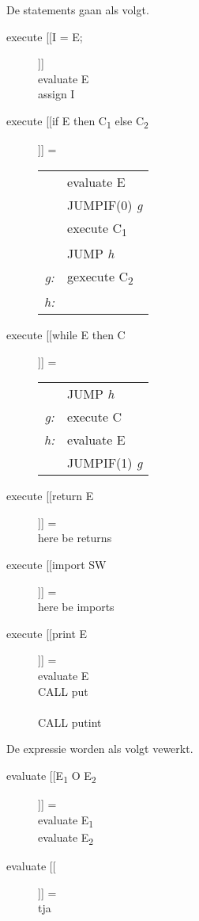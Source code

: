 De statements gaan als volgt.
\begin{description}
    \item[execute [[I = E;]]] \hfill \\
        evaluate E \\
        assign I
    \item[execute [[if E then C\textsubscript{1} else C\textsubscript{2}]]] = \hfill \\
        \begin{tabular}{c l}
            &evaluate E \\
            &JUMPIF(0) \emph{g} \\
            &execute C\textsubscript{1} \\
            &JUMP \emph{h} \\
    \emph{g:}&gexecute C\textsubscript{2} \\
    \emph{h:}& \\
        \end{tabular}
    \item[execute [[while E then C]]] = \hfill \\
        \begin{tabular}{c l}
            &JUMP \emph{h} \\
    \emph{g:}&execute C \\
    \emph{h:}&evaluate E \\
            &JUMPIF(1) \emph{g} \\
        \end{tabular} 
    \item[execute [[return E]]]  = \hfill \\
        here be returns
    \item[execute [[import SW]]] = \hfill \\ 
        here be imports
    \item[execute [[print E]]] = \hfill \\
        evaluate E \\
        CALL put \\
         \\
        CALL putint
\end{description}

De expressie worden als volgt vewerkt.
\begin{description}
    \item[evaluate [[E\textsubscript{1} O E\textsubscript{2}]]] = \hfill \\
        evaluate E\textsubscript{1} \\
        evaluate E\textsubscript{2} \\
    \item[evaluate [[]]] = \hfill \\
        tja
\end{description}
\clearpage